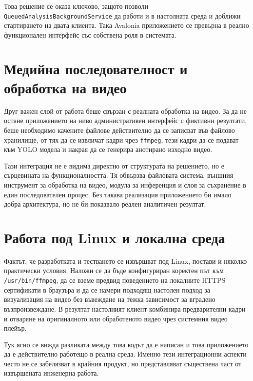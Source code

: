 Това решение се оказа ключово, защото позволи \texttt{QueuedAnalysisBackgroundService} да работи и в настолната среда и доближи стартирането на двата клиента. Така Avalonia приложението се превърна в реално функционален интерфейс със собствена роля в системата.

\section{Медийна последователност и обработка на видео}

Друг важен слой от работа беше свързан с реалната обработка на видео. За да не остане приложението на ниво административен интерфейс с фиктивни резултати, беше необходимо качените файлове действително да се записват във файлово хранилище, от тях да се извличат кадри чрез \texttt{ffmpeg}, тези кадри да се подават към YOLO модела и накрая да се генерира анотирано изходно видео.

Тази интеграция не е видима директно от структурата на решението, но е сърцевината на функционалността. Тя обвързва файловата система, външния инструмент за обработка на видео, модула за инференция и слоя за съхранение в един последователен процес. Без такава реализация приложението би имало добра архитектура, но не би показвало реален аналитичен резултат.

\section{Работа под Linux и локална среда}

Фактът, че разработката и тестването се извършват под Linux, постави и няколко практически условия. Наложи се да бъде конфигуриран коректен път към \texttt{/usr/bin/ffmpeg}, да се вземе предвид поведението на локалните HTTPS сертификати в браузъра и да се намери подходящ настолен подход за визуализация на видео без въвеждане на тежка зависимост за вградено възпроизвеждане. В резултат настолният клиент комбинира предварителни кадри и отваряне на оригиналното или обработеното видео чрез системния видео плейър.

Тук ясно се вижда разликата между това кодът да е написан и това приложението да е действително работещо в реална среда. Именно тези интеграционни аспекти често не се забелязват в крайния продукт, но представляват съществена част от извършената инженерна работа.
